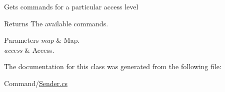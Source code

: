 Gets commands for a particular access level 

\begin{DoxyReturn}{Returns}
The available commands.
\end{DoxyReturn}

\begin{DoxyParams}{Parameters}
{\em map} & Map.\\
\hline
{\em access} & Access.\\
\hline
\end{DoxyParams}


The documentation for this class was generated from the following file\+:\begin{DoxyCompactItemize}
\item 
Command/\hyperlink{Sender_8cs}{Sender.\+cs}\end{DoxyCompactItemize}
